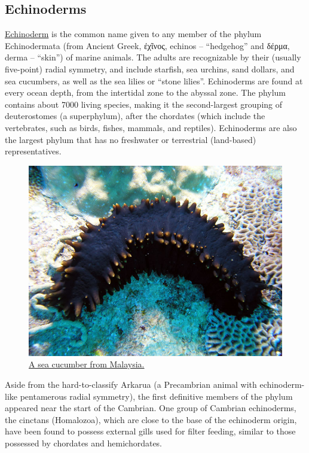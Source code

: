 \hypertarget{echinoderms}{%
\subsection{Echinoderms}\label{echinoderms}}

\href{https://en.wikipedia.org/wiki/Echinoderm}{Echinoderm} is the common name given to any member of the phylum Echinodermata (from Ancient Greek, ἐχῖνος, echinos -- ``hedgehog'' and δέρμα, derma -- ``skin'') of marine animals. The adults are recognizable by their (usually five-point) radial symmetry, and include starfish, sea urchins, sand dollars, and sea cucumbers, as well as the sea lilies or ``stone lilies''. Echinoderms are found at every ocean depth, from the intertidal zone to the abyssal zone. The phylum contains about 7000 living species, making it the second-largest grouping of deuterostomes (a superphylum), after the chordates (which include the vertebrates, such as birds, fishes, mammals, and reptiles). Echinoderms are also the largest phylum that has no freshwater or terrestrial (land-based) representatives.



\begin{figure}

{\centering \includegraphics[width=0.7\linewidth]{./figures/animals/Sea_cucumber_at_Pulau_Redang} 

}

\caption{\href{https://commons.wikimedia.org/wiki/File:Sea_cucumber_at_Pulau_Redang.jpg}{A sea cucumber from Malaysia.}}\label{fig:seacucumber}
\end{figure}

Aside from the hard-to-classify Arkarua (a Precambrian animal with echinoderm-like pentamerous radial symmetry), the first definitive members of the phylum appeared near the start of the Cambrian. One group of Cambrian echinoderms, the cinctans (Homalozoa), which are close to the base of the echinoderm origin, have been found to possess external gills used for filter feeding, similar to those possessed by chordates and hemichordates.

